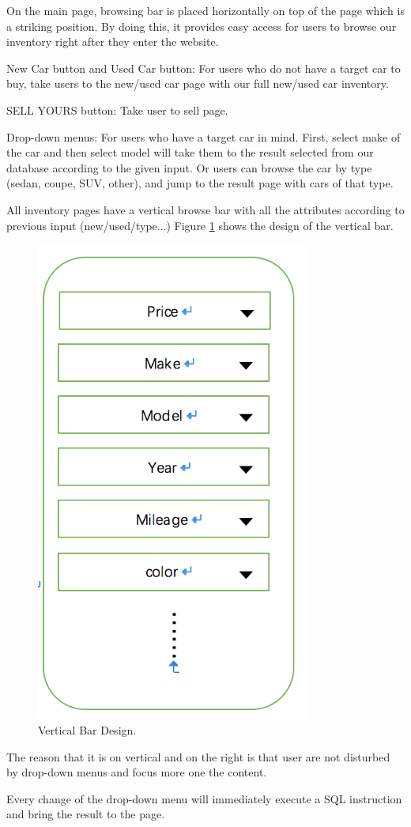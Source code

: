 \documentclass[12pt]{article}
\begin{document}
\par On the main page, browsing bar is placed horizontally on top of the page which is a striking position. By doing this, it provides easy access for users to browse our inventory right after they enter the website.\par
New Car button and Used Car button: For users who do not have a target car to buy, take users to the new/used car page with our full new/used car inventory.\par
SELL YOURS button: Take user to sell page.\par
Drop-down menus: For users who have a target car in mind. First, select make of the car and then select model will take them to the result selected from our database according to the given input. Or users can browse the car by type (sedan, coupe, SUV, other), and jump to the result page with cars of that type.\par
All inventory pages have a vertical browse bar with all the attributes according to previous input (new/used/type...) Figure \ref{verBar} shows the design of the vertical bar.
\begin{figure}[!h]
\caption{Vertical Bar Design.} \label{verBar}
\begin{center}
\includegraphics[width=9cm]{vertical_bar}
\end{center}
\end{figure}
\par The reason that it is on vertical and on the right is that user are not disturbed by drop-down menus and focus more one the content.\par
Every change of the drop-down menu will immediately execute a SQL instruction and bring the result to the page.
\end{document}
